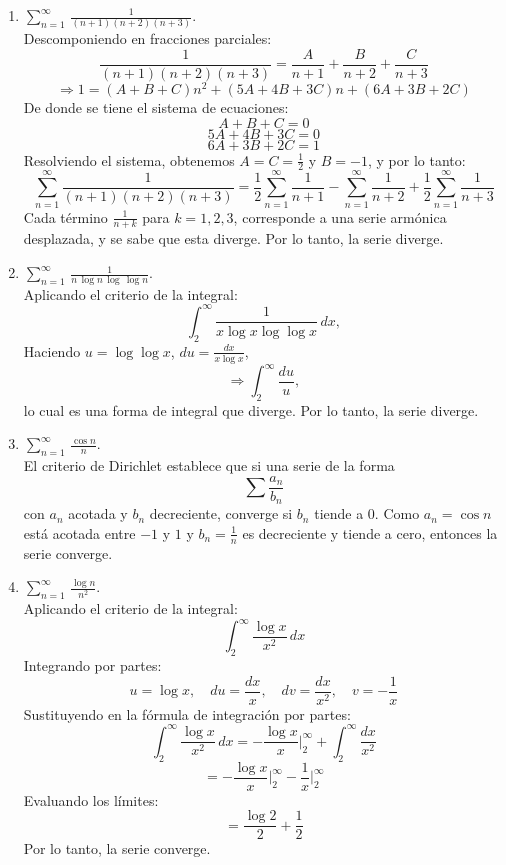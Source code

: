 \documentclass{article}
\begin{document}
\begin{enumerate}
\begin{enumerate}
\textbf{ii)} \( \lim_{n \to \infty} \frac{n}{2^n} \) es una forma \( \frac{\infty}{\infty} \).
Aplicando L'Hôpital:
\[
\lim_{n \to \infty} \frac{1}{2^n \ln 2},
\]
y como el denominador crece exponencialmente, 
\[
\lim = 0.
\]
Por lo tanto, la serie converge.

\item $\displaystyle\sum_{n=1}^{\infty}\,\frac{1}{(n+1)(n+2)(n+3)}$.
\[\]
Descomponiendo en fracciones parciales:
\[
\frac{1}{(n+1)(n+2)(n+3)} = \frac{A}{n+1} + \frac{B}{n+2} + \frac{C}{n+3}
\]
\[
\Rightarrow 1 = (A + B + C)n^2 + (5A + 4B + 3C)n + (6A + 3B + 2C)
\]
De donde se tiene el sistema de ecuaciones:
\[
A + B + C = 0
\]
\[
5A + 4B + 3C = 0
\]
\[
6A + 3B + 2C = 1
\]
Resolviendo el sistema, obtenemos \( A = C = \frac{1}{2} \) y \( B = -1 \), y por lo tanto:
\[
\sum_{n=1}^{\infty} \frac{1}{(n+1)(n+2)(n+3)} = \frac{1}{2} \sum_{n=1}^{\infty} \frac{1}{n+1} - \sum_{n=1}^{\infty} \frac{1}{n+2} + \frac{1}{2} \sum_{n=1}^{\infty} \frac{1}{n+3}
\]
Cada término \( \frac{1}{n+k} \) para \( k = 1, 2, 3 \), corresponde a una serie armónica desplazada, y se sabe que esta diverge. Por lo tanto, la serie diverge.
\item $\displaystyle\sum_{n=1}^{\infty}\,\frac{1}{n\,\log n\,\log\,\log n}$.
\[\]
Aplicando el criterio de la integral:
\[
\int_{2}^{\infty} \frac{1}{x \log x \log \log x} \, dx,
\]
Haciendo \( u = \log \log x \), \( du = \frac{dx}{x \log x} \),
\[
\Rightarrow \int_{2}^{\infty} \frac{du}{u},
\]
lo cual es una forma de integral que diverge. Por lo tanto, la serie diverge.

\item $\displaystyle\sum_{n=1}^{\infty}\,\frac{\cos n}{n}$.
\[\]
El criterio de Dirichlet establece que si una serie de la forma 
\[
\sum \frac{a_n}{b_n}
\]
con \( a_n \) acotada y \( b_n \) decreciente, converge si \( b_n \) tiende a 0. Como \( a_n = \cos n \) está acotada entre \( -1 \) y \( 1 \) y \( b_n = \frac{1}{n} \) es decreciente y tiende a cero, entonces la serie converge.

\item $\displaystyle\sum_{n=1}^{\infty}\,\frac{\log n}{n^2}$.
\[\]
Aplicando el criterio de la integral:
\[
\int_{2}^{\infty} \frac{\log x}{x^2} \, dx
\]
Integrando por partes:
\[
u = \log x, \quad du = \frac{dx}{x}, \quad dv = \frac{dx}{x^2}, \quad v = -\frac{1}{x}
\]
Sustituyendo en la fórmula de integración por partes:
\[
\int_{2}^{\infty} \frac{\log x}{x^2} \, dx = -\frac{\log x}{x} \bigg|_2^\infty + \int_{2}^{\infty} \frac{dx}{x^2}
\]
\[
= -\frac{\log x}{x} \bigg|_2^\infty - \frac{1}{x} \bigg|_2^\infty
\]
Evaluando los límites:
\[
= \frac{\log 2}{2} + \frac{1}{2}
\]
Por lo tanto, la serie converge.


\end{enumerate}
\end{enumerate}
\end{document}
